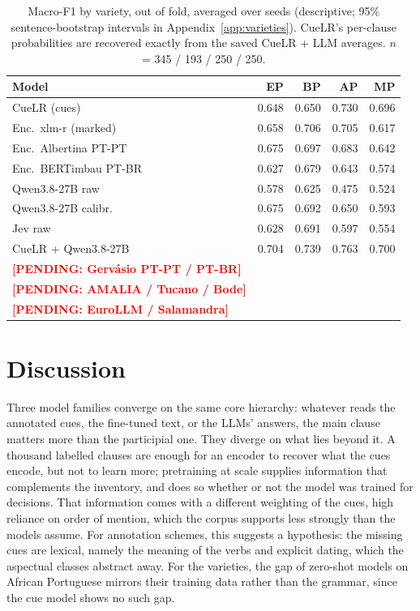 \documentclass[11pt]{article}
\newcommand{\pending}[1]{\textcolor{red}{\textbf{[PENDING: #1]}}}
\begin{document}
\begin{table}[t]
\centering\small
\setlength{\tabcolsep}{3.5pt}
\begin{tabular}{lrrrr}
\toprule
Model & EP & BP & AP & MP \\
\midrule
CueLR (cues) & 0.648 & 0.650 & 0.730 & 0.696 \\
Enc.\ xlm-r (marked) & 0.658 & 0.706 & 0.705 & 0.617 \\
Enc.\ Albertina PT-PT & 0.675 & 0.697 & 0.683 & 0.642 \\
Enc.\ BERTimbau PT-BR & 0.627 & 0.679 & 0.643 & 0.574 \\
Qwen3.8-27B raw & 0.578 & 0.625 & 0.475 & 0.524 \\
Qwen3.8-27B calibr. & 0.675 & 0.692 & 0.650 & 0.593 \\
Jev raw & 0.628 & 0.691 & 0.597 & 0.554 \\
CueLR + Qwen3.8-27B & 0.704 & 0.739 & 0.763 & 0.700 \\
\midrule
\pending{Gervásio PT-PT / PT-BR} & & & & \\
\pending{AMALIA / Tucano / Bode} & & & & \\
\pending{EuroLLM / Salamandra} & & & & \\
\bottomrule
\end{tabular}
\caption{Macro-F1 by variety, out of fold, averaged over seeds (descriptive; 95\% sentence-bootstrap intervals in Appendix~\ref{app:varieties}). CueLR's per-clause probabilities are recovered exactly from the saved CueLR + LLM averages. $n$ = 345 / 193 / 250 / 250.}
\label{tab:varieties}
\end{table}

\section{Discussion}
\label{sec:discussion}
Three model families converge on the same core hierarchy: whatever reads the annotated cues, the fine-tuned text, or the LLMs' answers, the main clause matters more than the participial one. They diverge on what lies beyond it. A thousand labelled clauses are enough for an encoder to recover what the cues encode, but not to learn more; pretraining at scale supplies information that complements the inventory, and does so whether or not the model was trained for decisions. That information comes with a different weighting of the cues, high reliance on order of mention, which the corpus supports less strongly than the models assume. For annotation schemes, this suggests a hypothesis: the missing cues are lexical, namely the meaning of the verbs and explicit dating, which the aspectual classes abstract away. For the varieties, the gap of zero-shot models on African Portuguese mirrors their training data rather than the grammar, since the cue model shows no such gap.
\end{document}
